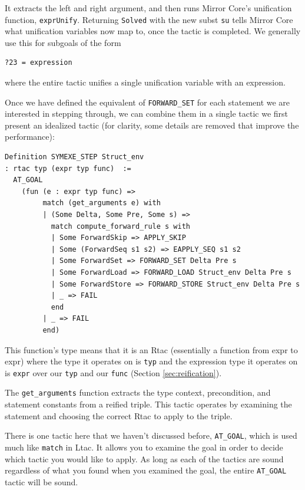 \documentclass{puthesis}
\begin{document}
It extracts the left and right argument, and then runs Mirror Core's
unification function, \lstinline|exprUnify|. Returning
\lstinline|Solved| with the new subst \lstinline|su| tells Mirror Core
what unification variables now map to, once the tactic is completed.
We generally use this for subgoals of the form 

\begin{lstlisting}
?23 = expression
\end{lstlisting}

where the entire tactic unifies a single unification variable with an expression.

Once we have defined the equivalent of \lstinline|FORWARD_SET| for
each statement we are interested in stepping through, we can combine
them in a single tactic we first present an idealized tactic (for
clarity, some details are removed that improve the performance):
\pagebreak
\begin{lstlisting}
Definition SYMEXE_STEP Struct_env
: rtac typ (expr typ func)  :=
  AT_GOAL
    (fun (e : expr typ func) => 
         match (get_arguments e) with
         | (Some Delta, Some Pre, Some s) =>  
           match compute_forward_rule s with
           | Some ForwardSkip => APPLY_SKIP
           | Some (ForwardSeq s1 s2) => EAPPLY_SEQ s1 s2 
           | Some ForwardSet => FORWARD_SET Delta Pre s
           | Some ForwardLoad => FORWARD_LOAD Struct_env Delta Pre s
           | Some ForwardStore => FORWARD_STORE Struct_env Delta Pre s
           | _ => FAIL
           end
         | _ => FAIL
         end)
\end{lstlisting}

This function's type means that it is an Rtac (essentially a function
from expr to expr) where the type it operates on is \lstinline|typ|
and the expression type it operates on is \lstinline|expr| over our
\lstinline|typ| and our \lstinline|func| (Section \ref{sec:reification}).

The \lstinline|get_arguments| function extracts the type context,
precondition, and statement constants from a reified triple. This
tactic operates by examining the statement and choosing the correct
Rtac to apply to the triple. 

There is one tactic here that we haven't discussed before,
\lstinline|AT_GOAL|, which is used much like \lstinline|match| in
Ltac. It allows you to examine the goal in order to decide which
tactic you would like to apply. As long as each of the tactics are
sound regardless of what you found when you examined the goal, the
entire \lstinline|AT_GOAL| tactic will be sound.
\end{document}
